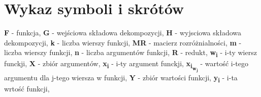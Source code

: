 \chapter*{Wykaz symboli i skrótów}

\noindent
\textbf{F} - funkcja, \newline
\textbf{G} - wejściowa składowa dekompozycji, \newline
\textbf{H} - wyjsciowa składowa dekompozycji, \newline
\textbf{k} - liczba wierszy funkcji, \newline
\textbf{MR} - macierz rozróżnialności, \newline
\textbf{m} - liczba wierszy funkcji, \newline
\textbf{n} - liczba argumentów funkcji, \newline
\textbf{R} - redukt, \newline
\textbf{w\textsubscript{i}} - i-ty wiersz funckji,\newline
\textbf{X} - zbiór argumentów, \newline
\textbf{x\textsubscript{i}} - i-ty argument funckji, \newline
\textbf{x\textsubscript{i\textsubscript{w\textsubscript{j}}}} - wartość i-tego argumentu dla j-tego wiersza w funkcji, \newline
\textbf{Y} - zbiór wartości funkcji, \newline
\textbf{y\textsubscript{i}} - i-ta wrtość funkcji, \newline

\cleardoublepage
